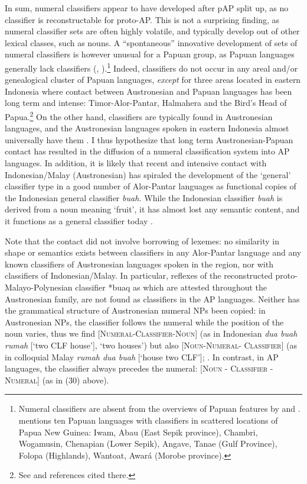 In sum, numeral classifiers appear to have developed after pAP split up, as no classifier is reconstructable for proto-AP. This is not a surprising finding, as numeral classifier sets are often highly volatile, and typically develop out of other lexical classes, such as nouns. A ``spontaneous'' innovative development of sets of numeral classifiers is however unusual for a Papuan group, as Papuan languages generally lack classifiers (\citet[123]{Aikhenvald2000}, \citet{Klamer2014}).\footnote{Numeral classifiers are absent from the overviews of Papuan features by \citet{Foley1986,Foley2000} and \citet{AikhenvaldEtAl2007}. \citet[123]{Aikhenvald2000}  mentions ten Papuan languages with classifiers in scattered locations of Papua New Guinea: Iwam, Abau (East Sepik province), Chambri, Wogamusin, Chenapian (Lower Sepik), Angave, Tanae (Gulf Province), Folopa (Highlands), Wantoat, Awar\'a (Morobe province).} Indeed, classifiers do not occur in any areal and/or genealogical cluster of Papuan languages, \textit{except} for three areas located in eastern Indonesia where contact between Austronesian and Papuan languages has been long term and intense: Timor-Alor-Pantar, Halmahera and the Bird's Head of Papua.\footnote{See \citet{Holtontaa,Klamer2014,Klamertaa} and references cited there.} On the other hand, classifiers are typically found in Austronesian languages, and the Austronesian languages spoken in eastern Indonesia almost universally have them \citep{Klamer2013,Klamertaa}. I thus hypothesize that long term Austronesian-Papuan contact has resulted in the diffusion of a numeral classification system into AP languages. In addition, it is likely that recent and intensive contact with Indonesian/Malay (Austronesian) has spiraled the development of the `general' classifier type in a good number of Alor-Pantar languages as functional copies of the Indonesian general classifier \textit{buah.} While the Indonesian classifier \textit{buah} is derived from a noun meaning `fruit', it has almost lost any semantic content, and it functions as a general classifier today \citep{Hopper1986,Chung2010}.

Note that the contact did not involve borrowing of lexemes: no similarity in shape or semantics exists between classifiers in any Alor-Pantar language and any known classifiers of Austronesian languages spoken in the region, nor with classifiers of Indonesian/Malay. In particular, reflexes of the reconstructed proto-Malayo-Polynesian classifier *buaq as which are attested throughout the Austronesian family, are not found as classifiers in the AP languages. Neither has the grammatical structure of Austronesian numeral NPs been copied: in Austronesian NPs, the classifier follows the numeral while the position of the noun varies, thus we find [\textsc{Numeral-Classifier-Noun}] (as in Indonesian \textit{dua buah rumah} [`two CLF house'], `two houses') but also \textsc{[Noun-Numeral- Classifier]} (as in colloquial Malay \textit{rumah dua buah} [`house two CLF']; \citet[283-284]{Blust2009}. In contrast, in AP languages, the classifier always precedes the numeral: \textsc{[Noun - Classifier - Numeral] (}as in (30) above).

